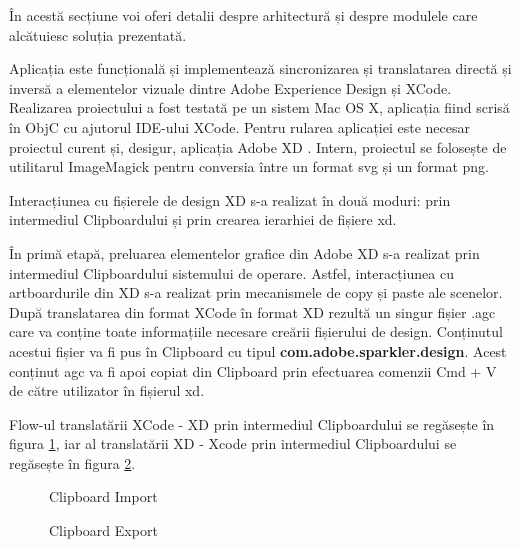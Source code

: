 În acestă secțiune voi oferi detalii despre arhitectură și despre modulele care alcătuiesc soluția prezentată.

Aplicația este funcțională și implementează sincronizarea și translatarea directă și inversă a elementelor vizuale dintre Adobe Experience Design și XCode. 
Realizarea proiectului a fost testată pe un sistem Mac OS X, aplicația fiind scrisă în ObjC cu ajutorul IDE-ului XCode. Pentru rularea aplicației este necesar proiectul curent \cite{repoGit} și, desigur, aplicația Adobe XD \cite{xd}.
Intern, proiectul se folosește de utilitarul ImageMagick \cite{imageMagick} pentru conversia între un format svg și un format png.

Interacțiunea cu fișierele de design XD s-a realizat în două moduri: prin intermediul Clipboardului și prin crearea ierarhiei de fișiere xd.

În primă etapă, preluarea elementelor grafice din Adobe XD s-a realizat prin intermediul Clipboardului sistemului de operare. Astfel, interacțiunea cu artboardurile din XD s-a realizat prin mecanismele de copy și paste ale scenelor.
După translatarea din format XCode în format XD rezultă un singur fișier .agc care va conține toate informațiile necesare creării fișierului de design. Conținutul acestui fișier va fi pus în Clipboard cu tipul \textbf{com.adobe.sparkler.design}. Acest conținut agc va fi apoi copiat din Clipboard prin efectuarea comenzii Cmd + V de către utilizator în fișierul xd.

Flow-ul translatării XCode - XD prin intermediul Clipboardului se regăsește în figura \ref{fig:Clipboard Import}, iar al translatării XD - Xcode prin intermediul Clipboardului se regăsește în figura \ref{fig:Clipboard Export}.


\begin{figure}[!htbp]
\centering
{}
\caption{Clipboard Import} \label{fig:Clipboard Import}
\end{figure}

\begin{figure}[!htbp]
\centering
{}
\caption{Clipboard Export} \label{fig:Clipboard Export}
\end{figure}


